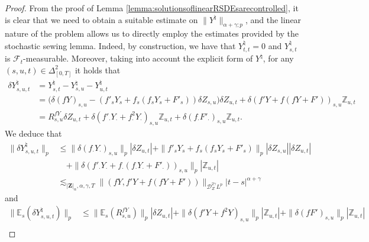 \documentclass[11pt,a4paper]{article}
\newcommand{\E}{\mathbb{E}}
\theoremstyle{plain}
\begin{document}
\begin{proof} 
From the proof of Lemma \ref{lemma:solutionsoflinearRSDEsarecontrolled}, it is clear that we need to obtain a suitable estimate on $\|Y^\natural\|_{\alpha+\gamma;p}$, and the linear nature of the problem allows us to directly employ the estimates provided by the stochastic sewing lemma. Indeed, by construction, we have that $Y^\natural_{t,t}=0$ and $Y^\natural_{s,t}$ is $\mathcal{F}_t$-measurable. Moreover, taking into account the explicit form of $Y^\natural$,
    for any $(s,u,t)\in\Delta^2_{[0,T]}$ it holds that  \begin{equation*} \label{eq:deltaYnaturalinaprioriestimates}
        \begin{aligned}
            \delta Y^\natural_{s,u,t} &= Y^\natural_{s,t} - Y^\natural_{s,u} - Y^\natural_{u,t}   \\
            &= \big(\delta (f Y)_{s,u} -  (f'_sY_s+f_s(f_sY_s+F'_s))\delta Z_{s,u}\big) \delta Z_{u,t} + \delta (f' Y +f(f Y+ F'))_{s,u} \mathbb{Z}_{u,t}  \\ &= R_{s,u}^{f Y} \delta Z_{u,t} + \delta (f'_\cdot Y_\cdot +f_\cdot^2 Y_\cdot)_{s,u} \mathbb{Z}_{u,t} + \delta (f_\cdot F'_\cdot)_{s,u} \mathbb{Z}_{u,t}.
        \end{aligned}
    \end{equation*}
    We deduce that 
    \begin{equation} \label{eq:deltaYnaturalestimate1_firstversion}
        \begin{aligned}
            \|\delta Y^\natural_{s,u,t}\|_p &\le \|\delta (f_\cdot Y_\cdot)_{s,u} \|_p |\delta Z_{u,t}| + \|f'_sY_s+f_s(f_sY_s+F'_s)\|_p|\delta Z_{s,u}|| \delta Z_{u,t}| \\& \quad  + \|\delta (f'_\cdot Y_\cdot +f_\cdot (f_\cdot Y_\cdot + F'_\cdot))_{s,u} \|_p |\mathbb{Z}_{u,t}|  \\
            &\lesssim_{|\mathbf{Z}|_\alpha,\alpha,\gamma,T} \|(f Y,f'Y+f(f Y+F'))\|_{\mathscr{D}_Z^{2\gamma}L^p} |t-s|^{\alpha+\gamma}
        \end{aligned}
    \end{equation} and \begin{equation} \label{eq:deltaYnaturalestimate2_secondversion} \begin{aligned}
        \|\E_s(\delta Y^\natural_{s,u,t})\|_p &\le \|\E_s(R_{s,u}^{f Y})\|_p |\delta Z_{u,t}| + \|\delta (f' Y +f^2 Y)_{s,u}\|_p |\mathbb{Z}_{u,t}| + \|\delta (f F')_{s,u}\|_p |\mathbb{Z}_{u,t}| \\

\end{aligned}
\end{equation}
\end{proof}
\end{document}
